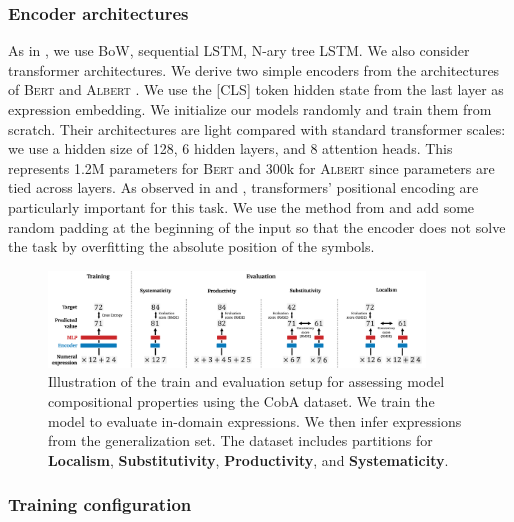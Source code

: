 \subsubsection{Encoder architectures}

As in , we use BoW, sequential LSTM, N-ary tree LSTM. We also consider transformer architectures. We derive two simple encoders from the architectures of \textsc{Bert} \parencite{devlin_19} and \textsc{Albert} \parencite{lan_20}. We use the \textsc{[CLS]} token hidden state from the last layer as expression embedding. We initialize our models randomly and train them from scratch. Their architectures are light compared with standard transformer scales: we use a hidden size of 128, 6 hidden layers, and 8 attention heads. This represents 1.2M parameters for \textsc{Bert} and 300k for \textsc{Albert} since parameters are tied across layers. As observed in \textcite{csordas_21} and \textcite{onta_21}, transformers' positional encoding are particularly important for this task. We use the method from \textcite{wallace_19} and add some random padding at the beginning of the input so that the encoder does not solve the task by overfitting the absolute position of the symbols.

\begin{figure}[htb!]
    \centering
    \includegraphics[width=10cm]{images/compositional_tasks_5.png}
    \caption{Illustration of the train and evaluation setup for assessing model compositional properties using the CobA dataset. We train the model to evaluate in-domain expressions. We then infer expressions from the generalization set. The dataset includes partitions for \textbf{Localism}, \textbf{Substitutivity}, \textbf{Productivity}, and \textbf{Systematicity}.}
    \label{fig:illustration}
\end{figure}


\subsubsection{Training configuration}

